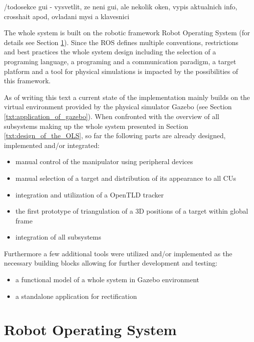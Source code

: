 
/todo{sekce gui - vysvetlit, ze neni gui, ale nekolik oken, vypis aktualnich info, crosshait apod, ovladani mysi a klavesnici}

The whole system is built on the robotic framework Robot Operating System (for details see Section \ref{txt:robot_operating_system}). Since the ROS defines multiple conventions, restrictions and best practices the whole system design including the selection of a programing language, a programing and a communication paradigm, a target platform and a tool for physical simulations is impacted by the possibilities of this framework.

As of writing this text a current state of the implementation mainly builds on the virtual environment provided by the physical simulator Gazebo (see Section \ref{txt:application_of_gazebo}). When confronted with the overview of all subsystems making up the whole system presented in Section \ref{txt:design_of_the_OLS}, so far the following parts are already designed, implemented and/or integrated:

\begin{itemize}
	\item manual control of the manipulator using peripheral devices
	\item manual selection of a target and distribution of its appearance to all CUs
	\item integration and utilization of a OpenTLD tracker
	\item the first prototype of triangulation of a 3D positions of a target within global frame
	\item integration of all subsystems
\end{itemize}

Furthermore a few additional tools were utilized and/or implemented as the necessary building blocks allowing for further development and testing:

\begin{itemize}
	\item a functional model of a whole system in Gazebo environment
	\item a standalone application for rectification
\end{itemize}


\section{Robot Operating System} \label{txt:robot_operating_system}

